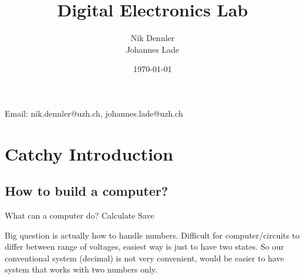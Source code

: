 \documentclass[10pt,a4paper]{article}
\author{Nik Dennler \\ Johannes Lade}
\title{Digital Electronics Lab}
\date{\today{}}
\begin{document}
	
\begin{titlepage}
	\maketitle
		\begin{center}
			Email: nik.dennler@uzh.ch, johannes.lade@uzh.ch
		\end{center}
	\thispagestyle{empty}
\end{titlepage}




\tableofcontents
\newpage

\section{Catchy Introduction}
\subsection{How to build a computer?}
What can a computer do?
Calculate
Save

Big question is actually how to handle numbers. Difficult for computer/circuits to differ between range of voltages, easiest way is just to have two states. So our conventional system (decimal) is not very convenient, would be easier to have system that works with two numbers only. 







\end{document}
